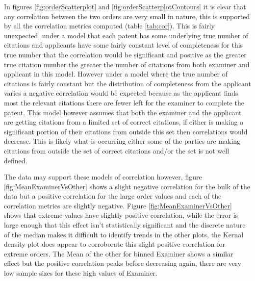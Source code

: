 In figures \ref{fig:orderScatterplot} and \ref{fig:orderScatterplotContours} it is clear that any correlation between the two orders are very small in nature, this is supported by all the correlation metrics computed (table \ref{tab:cor}). This is fairly unexpected, under a model that each patent has some underlying true number of citations and applicants have some fairly constant level of completeness for this true number that the correlation would be significant and positive as the greater true citation number the greater the number of citations from both examiner and applicant in this model. However under a model where the true number of citations is fairly constant but the distribution of completeness from the applicant varies a negative correlation would be expected because as the applicant finds most the relevant citations there are fewer left for the examiner to complete the patent. This model however assumes that both the examiner and the applicant are getting citations from a limited set of correct citations, if either is making a significant portion of their citations from outside this set then correlations would decrease. This is likely what is occurring either some of the parties are making citations from outside the set of correct citations and/or the set is not well defined. 

The data may support these models of correlation however, figure \ref{fig:MeanExaminerVsOther} shows a slight negative correlation for the bulk of the data but a positive correlation for the large order values and each of the correlation metrics are slightly negative. Figure \ref{fig:MeanExaminerVsOther} shows that extreme values have slightly positive correlation, while the error is large enough that this effect isn't statistically significant and the discrete nature of the median makes it difficult to identify trends in the other plots, the Kernal density plot does appear to corroborate this slight positive correlation for extreme orders. The Mean of the other for binned Examiner shows a similar effect but the positive correlation peaks before decreasing again, there are  very low sample sizes for these high values of Examiner. 

